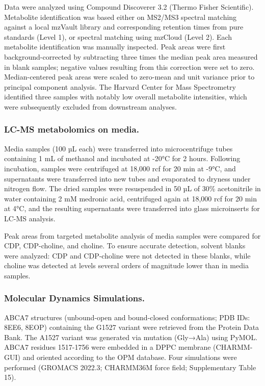 Data were analyzed using Compound Discoverer 3.2 (Thermo Fisher Scientific). Metabolite identification was based either on MS2/MS3 spectral matching against a local mzVault library and corresponding retention times from pure standards (Level 1), or spectral matching using mzCloud (Level 2). Each metabolite identification was manually inspected. Peak areas were first background-corrected by subtracting three times the median peak area measured in blank samples; negative values resulting from this correction were set to zero. Median-centered peak areas were scaled to zero-mean and unit variance prior to principal component analysis. The Harvard Center for Mass Spectrometry identified three samples with notably low overall metabolite intensities, which were subsequently excluded from downstream analyses.

\subsubsection{LC-MS metabolomics on media.}
Media samples (100 µL each) were transferred into microcentrifuge tubes containing 1 mL of methanol and incubated at -20°C for 2 hours. Following incubation, samples were centrifuged at 18,000 rcf for 20 min at -9°C, and supernatants were transferred into new tubes and evaporated to dryness under nitrogen flow. The dried samples were resuspended in 50 µL of 30\% acetonitrile in water containing 2 mM medronic acid, centrifuged again at 18,000 rcf for 20 min at 4°C, and the resulting supernatants were transferred into glass microinserts for LC-MS analysis.

Peak areas from targeted metabolite analysis of media samples were compared for CDP, CDP-choline, and choline. To ensure accurate detection, solvent blanks were analyzed: CDP and CDP-choline were not detected in these blanks, while choline was detected at levels several orders of magnitude lower than in media samples.

\subsubsection{Molecular Dynamics Simulations.}
ABCA7 structures (unbound-open and bound-closed conformations; PDB IDs: 8EE6, 8EOP) containing the G1527 variant were retrieved from the Protein Data Bank. The A1527 variant was generated via mutation (Gly→Ala) using PyMOL. ABCA7 residues 1517-1756 were embedded in a DPPC membrane (CHARMM-GUI) and oriented according to the OPM database. Four simulations were performed (GROMACS 2022.3; CHARMM36M force field; Supplementary Table 15).

